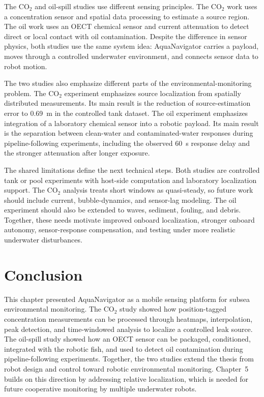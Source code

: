\documentclass{uhcoethesis}
\begin{document}
The \mbox{CO$_2$} and oil-spill studies use different sensing principles. The \mbox{CO$_2$} work uses a concentration sensor and spatial data processing to estimate a source region. The oil work uses an OECT chemical sensor and current attenuation to detect direct or local contact with oil contamination. Despite the difference in sensor physics, both studies use the same system idea: AquaNavigator carries a payload, moves through a controlled underwater environment, and connects sensor data to robot motion.

The two studies also emphasize different parts of the environmental-monitoring problem. The \mbox{CO$_2$} experiment emphasizes source localization from spatially distributed measurements. Its main result is the reduction of source-estimation error to 0.69~m in the controlled tank dataset. The oil experiment emphasizes integration of a laboratory chemical sensor into a robotic payload. Its main result is the separation between clean-water and contaminated-water responses during pipeline-following experiments, including the observed 60~s response delay and the stronger attenuation after longer exposure.

The shared limitations define the next technical steps. Both studies are controlled tank or pool experiments with host-side computation and laboratory localization support. The \mbox{CO$_2$} analysis treats short windows as quasi-steady, so future work should include current, bubble-dynamics, and sensor-lag modeling. The oil experiment should also be extended to waves, sediment, fouling, and debris. Together, these needs motivate improved onboard localization, stronger onboard autonomy, sensor-response compensation, and testing under more realistic underwater disturbances.

\section{Conclusion}

This chapter presented AquaNavigator as a mobile sensing platform for subsea environmental monitoring. The \mbox{CO$_2$} study showed how position-tagged concentration measurements can be processed through heatmaps, interpolation, peak detection, and time-windowed analysis to localize a controlled leak source. The oil-spill study showed how an OECT sensor can be packaged, conditioned, integrated with the robotic fish, and used to detect oil contamination during pipeline-following experiments. Together, the two studies extend the thesis from robot design and control toward robotic environmental monitoring. Chapter~5 builds on this direction by addressing relative localization, which is needed for future cooperative monitoring by multiple underwater robots.
\end{document}
